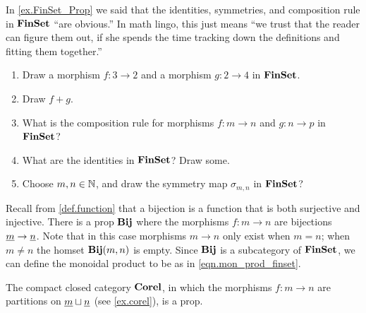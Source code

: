 \documentclass[7Sketches]{subfiles}
\begin{document}
\begin{exercise}%
\label{exc.finset_as_prop}%
In \cref{ex.FinSet_Prop} we said that the identities, symmetries, and
composition rule in $\mathbf{FinSet}$ ``are obvious.'' In math lingo, this just
means ``we trust that the reader can figure them out, if she spends the time tracking
down the definitions and fitting them together.''
\begin{enumerate}
	\item Draw a morphism $f\colon 3\to 2$ and a morphism $g\colon 2\to 4$ in $\mathbf{FinSet}$.
	\item Draw $f+g$.
	\item What is the composition rule for morphisms $f\colon m\to n$ and $g\colon n\to p$ in $\mathbf{FinSet}$?
	\item What are the identities in $\mathbf{FinSet}$? Draw some.
	\item Choose $m,n \in \mathbb{N}$, and draw the symmetry map $\sigma_{m,n}$
	in $\mathbf{FinSet}$?
\qedhere
\end{enumerate}
\end{exercise}


\begin{example}%
\label{ex.function_bijection}%
  Recall from \cref{def.function} that a bijection is a function that is both
  surjective and injective.  There is a prop $\mathbf{Bij}$ where the morphisms
  $f\colon m \to n$ are bijections $\underline{{m}} \to \underline{{n}}$. Note that in this case
  morphisms $m \to n$ only exist when $m = n$; when $m\neq n$ the homset
  $\mathbf{Bij}(m,n)$ is empty. Since $\mathbf{Bij}$ is a subcategory of
  $\mathbf{FinSet}$, we can define the monoidal product to be as in
  \cref{eqn.mon_prod_finset}.
\end{example}%
%

\begin{example}%
\label{ex.corelation}%
%
  The compact closed category $\mathbf{Corel}$, in which the morphisms $f\colon
  m \to n$ are partitions on $\underline{{m}}\sqcup \underline{{n}}$ (see \cref{ex.corel}), is a prop.
\end{example}
\end{document}
